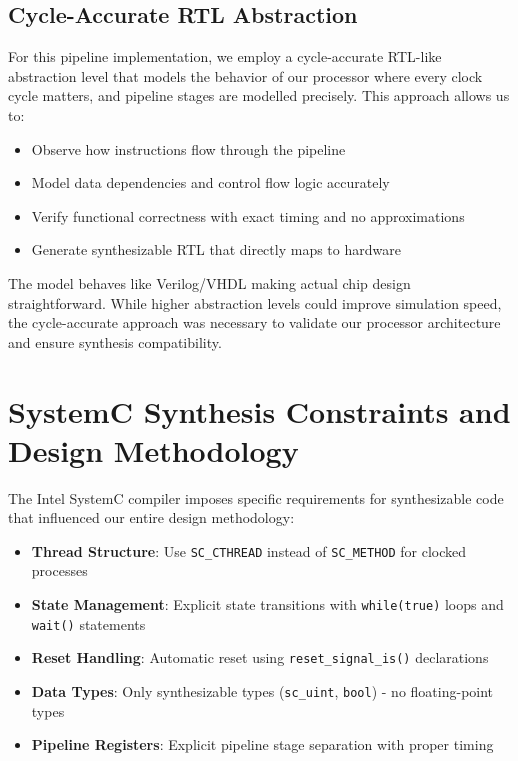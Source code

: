 \subsection{Cycle-Accurate RTL Abstraction}
\label{subsec:cycle_accurate}

For this pipeline implementation, we employ a cycle-accurate RTL-like abstraction level that models the behavior of our processor where every clock cycle matters, and pipeline stages are modelled precisely. This approach allows us to:

\begin{itemize}
    \item Observe how instructions flow through the pipeline
    \item Model data dependencies and control flow logic accurately
    \item Verify functional correctness with exact timing and no approximations
    \item Generate synthesizable RTL that directly maps to hardware
\end{itemize}

The model behaves like Verilog/VHDL making actual chip design straightforward. While higher abstraction levels could improve simulation speed, the cycle-accurate approach was necessary to validate our processor architecture and ensure synthesis compatibility.

\section{SystemC Synthesis Constraints and Design Methodology}
\label{sec:synthesis_constraints}

The Intel SystemC compiler imposes specific requirements for synthesizable code that influenced our entire design methodology:

\begin{itemize}
    \item \textbf{Thread Structure}: Use \texttt{SC\_CTHREAD} instead of \texttt{SC\_METHOD} for clocked processes
    \item \textbf{State Management}: Explicit state transitions with \texttt{while(true)} loops and \texttt{wait()} statements
    \item \textbf{Reset Handling}: Automatic reset using \texttt{reset\_signal\_is()} declarations
    \item \textbf{Data Types}: Only synthesizable types (\texttt{sc\_uint}, \texttt{bool}) - no floating-point types
    \item \textbf{Pipeline Registers}: Explicit pipeline stage separation with proper timing
\end{itemize}

